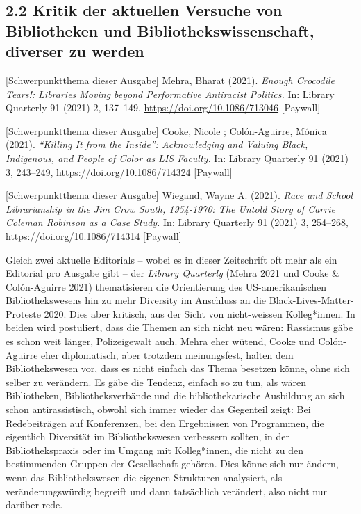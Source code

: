 \documentclass[a4paper,
fontsize=11pt,
oneside,
numbers=noperiodatend,
parskip=half-,
bibliography=totoc,
final
]{scrartcl}
\begin{document}
\hypertarget{kritik-der-aktuellen-versuche-von-bibliotheken-und-bibliothekswissenschaft-diverser-zu-werden}{%
\subsection{2.2 Kritik der aktuellen Versuche von Bibliotheken und
Bibliothekswissenschaft, diverser zu
werden}\label{kritik-der-aktuellen-versuche-von-bibliotheken-und-bibliothekswissenschaft-diverser-zu-werden}}

{[}Schwerpunktthema dieser Ausgabe{]} Mehra, Bharat (2021). \emph{Enough
Crocodile Tears!: Libraries Moving beyond Performative Antiracist
Politics.} In: Library Quarterly 91 (2021) 2, 137--149,
\url{https://doi.org/10.1086/713046} {[}Paywall{]}

{[}Schwerpunktthema dieser Ausgabe{]} Cooke, Nicole ; Colón-Aguirre,
Mónica (2021). \emph{\enquote{Killing It from the Inside}: Acknowledging
and Valuing Black, Indigenous, and People of Color as LIS Faculty.} In:
Library Quarterly 91 (2021) 3, 243--249,
\url{https://doi.org/10.1086/714324} {[}Paywall{]}

{[}Schwerpunktthema dieser Ausgabe{]} Wiegand, Wayne A. (2021).
\emph{Race and School Librarianship in the Jim Crow South, 1954-1970:
The Untold Story of Carrie Coleman Robinson as a Case Study.} In:
Library Quarterly 91 (2021) 3, 254--268,
\url{https://doi.org/10.1086/714314} {[}Paywall{]}

Gleich zwei aktuelle Editorials -- wobei es in dieser Zeitschrift oft
mehr als ein Editorial pro Ausgabe gibt -- der \emph{Library Quarterly}
(Mehra 2021 und Cooke \& Colón-Aguirre 2021) thematisieren die
Orientierung des US-amerikanischen Bibliothekswesens hin zu mehr
Diversity im Anschluss an die Black-Lives-Matter-Proteste 2020. Dies
aber kritisch, aus der Sicht von nicht-weissen Kolleg*innen. In beiden
wird postuliert, dass die Themen an sich nicht neu wären: Rassismus gäbe
es schon weit länger, Polizeigewalt auch. Mehra eher wütend, Cooke und
Colón-Aguirre eher diplomatisch, aber trotzdem meinungsfest, halten dem
Bibliothekswesen vor, dass es nicht einfach das Thema besetzen könne,
ohne sich selber zu verändern. Es gäbe die Tendenz, einfach so zu tun,
als wären Bibliotheken, Bibliotheksverbände und die bibliothekarische
Ausbildung an sich schon antirassistisch, obwohl sich immer wieder das
Gegenteil zeigt: Bei Redebeiträgen auf Konferenzen, bei den Ergebnissen
von Programmen, die eigentlich Diversität im Bibliothekswesen verbessern
sollten, in der Bibliothekspraxis oder im Umgang mit Kolleg*innen, die
nicht zu den bestimmenden Gruppen der Gesellschaft gehören. Dies könne
sich nur ändern, wenn das Bibliothekswesen die eigenen Strukturen
analysiert, als veränderungswürdig begreift und dann tatsächlich
verändert, also nicht nur darüber rede.
\end{document}

